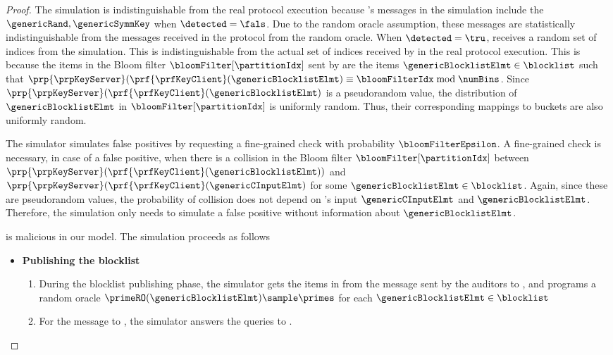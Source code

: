 \begin{proof}
The simulation is indistinguishable from the real protocol execution because \client's messages in the simulation include the $\genericRand,\genericSymmKey$ when $\detected = \fals$. Due to the random oracle assumption, these messages are statistically indistinguishable from the messages received in the protocol from the random oracle. When $\detected = \tru$, \client receives a random set of indices from the simulation. This is indistinguishable from the actual set of indices \partitionIDSet received by \client in the real protocol execution. This is because the items in the Bloom filter $\bloomFilter[\partitionIdx]$ sent by \client are the items $\genericBlocklistElmt \in \blocklist$ such that $\prp{\prpKeyServer}(\prf{\prfKeyClient}(\genericBlocklistElmt) \equiv \bloomFilterIdx \bmod \numBins$. Since $\prp{\prpKeyServer}(\prf{\prfKeyClient}(\genericBlocklistElmt)$ is a pseudorandom value, the distribution of $\genericBlocklistElmt$ in $\bloomFilter[\partitionIdx]$ is uniformly random. Thus, their corresponding mappings to buckets are also uniformly random. 

The simulator simulates false positives by requesting a fine-grained check with probability $\bloomFilterEpsilon$. A fine-grained check is necessary, in case of a false positive, when there is a collision in the Bloom filter $\bloomFilter[\partitionIdx]$ between 
$\prp{\prpKeyServer}(\prf{\prfKeyClient}(\genericBlocklistElmt))$ and $\prp{\prpKeyServer}(\prf{\prfKeyClient}(\genericCInputElmt)$ for some $\genericBlocklistElmt \in \blocklist$.  Again, since these are pseudorandom values, the probability of collision does not depend on \client's input $\genericCInputElmt$ and $\genericBlocklistElmt$. Therefore, the simulation only needs \bloomFilterEpsilon to simulate a false positive without information about $\genericBlocklistElmt$. 



%
\server is malicious in our model. The simulation proceeds as follows 


\begin{itemize} 
\item \textbf{Publishing the blocklist}
\begin{enumerate}
\item During the blocklist publishing phase, the simulator gets the items in \blocklist from the \publishList message sent by the auditors to \authOPRFFunc, and programs a random oracle $\primeRO(\genericBlocklistElmt) \sample \primes$ for each $\genericBlocklistElmt \in \blocklist$ 
\item For the message to \distSigningFunc, the simulator answers the queries to \primeRO. 
\end{enumerate}


\end{itemize}
\end{proof}
